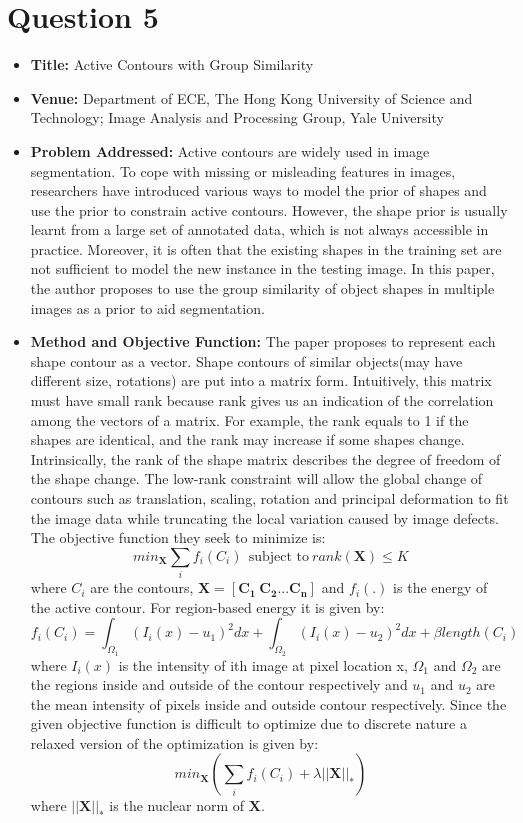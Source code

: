 \documentclass[12pt]{article}
\begin{document}
\section*{Question 5}
\begin{itemize}
	\item \textbf{Title:} Active Contours with Group Similarity
	\item \textbf{Venue:} Department of ECE, The Hong Kong University of Science and Technology; Image Analysis and Processing Group, Yale University
	\item \textbf{Problem Addressed:} Active contours are widely used in image segmentation. To cope with missing or misleading features in images, researchers have introduced various ways to model the prior of shapes and use the prior to constrain active contours. However, the shape prior is usually learnt from a large set of annotated data, which is not always accessible in practice. Moreover, it is often that the existing shapes in the training set are not sufficient to model the new instance in the testing image. In this paper, the author proposes to use the group similarity of object shapes in multiple images as a prior to aid segmentation. 
	\item \textbf{Method and Objective Function:} The paper proposes to represent each shape contour as a vector. Shape contours of similar objects(may have different size, rotations) are put into a matrix form. Intuitively, this matrix must have small rank because rank gives us an indication of the correlation among the vectors of a matrix. For example, the rank equals to 1 if the shapes are identical, and the rank may increase if some shapes change. Intrinsically, the rank of the shape matrix describes the degree of freedom of the shape change. The low-rank constraint will allow the global change of contours such as translation, scaling, rotation and principal deformation to fit the image data while truncating the local variation caused by image defects. The objective function they seek to minimize is:
	\begin{equation*}
		min_{\boldsymbol{X}}\sum_if_i(C_i) \ \ \textrm{subject to} \ rank(\boldsymbol{X}) \leq K
	\end{equation*}
	where $C_i$ are the contours, $\boldsymbol{X = [\boldsymbol{C_1 \ C_2...C_n}]}$ and $f_i(.)$ is the energy of the active contour. For region-based energy it is given by:
	\begin{equation*}
		f_i(C_i) = \int_{\Omega_1}(I_i(x)-u_1)^2dx+\int_{\Omega_2}(I_i(x)-u_2)^2dx+\beta length(C_i)
	\end{equation*}
	where $I_i(x)$ is the intensity of ith image at pixel location x, $\Omega_1$ and $\Omega_2$ are the regions inside and outside of the contour respectively and $u_1$ and $u_2$ are the mean intensity of pixels inside and outside contour respectively. Since the given objective function is difficult to optimize due to discrete nature a relaxed version of the optimization is given by:
	\begin{equation*}
		min_{\boldsymbol{X}}(\sum_if_i(C_i)+\lambda||\boldsymbol{X}||_*)
	\end{equation*}
	where $||\boldsymbol{X}||_*$ is the nuclear norm of $\boldsymbol{X}$.
\end{itemize}
	
\end{document}
